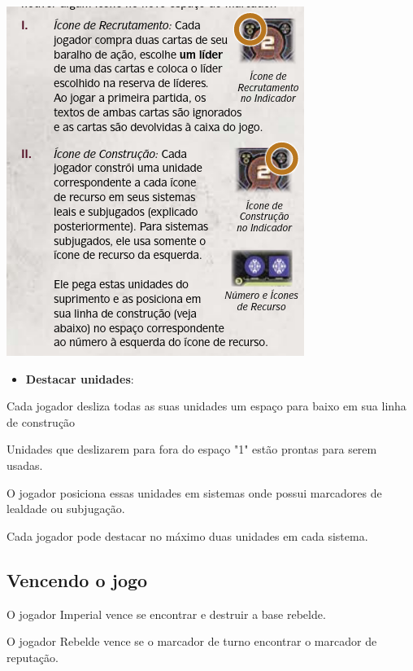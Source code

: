 \documentclass[11pt]{article}
\begin{document}
\begin{center}
\includegraphics[width=.9\linewidth]{./time-marker.png}
\end{center}

\begin{itemize}
\item \textbf{Destacar unidades}:
\end{itemize}

Cada jogador desliza todas as suas unidades um espaço para baixo em sua linha de construção

Unidades que deslizarem para fora do espaço "1" estão prontas para serem usadas.

O jogador posiciona essas unidades em sistemas onde possui marcadores de lealdade ou subjugação.

Cada jogador pode destacar no máximo duas unidades em cada sistema.

\subsection{Vencendo o jogo}
\label{sec:orgc46e00f}

O jogador Imperial vence se encontrar e destruir a base rebelde.

O jogador Rebelde vence se o marcador de turno encontrar o marcador de reputação.
\end{document}

